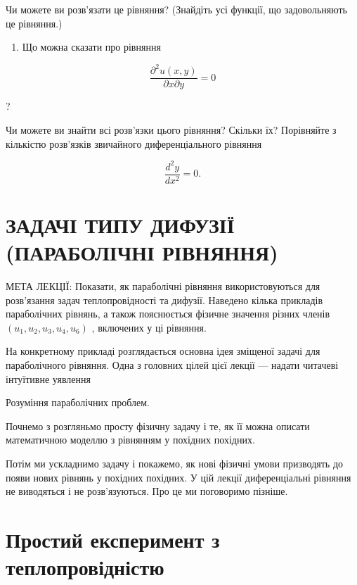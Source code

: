 \documentclass[
  ukrainian,
]{article}
\providecommand{\tightlist}{%
  \setlength{\itemsep}{0pt}\setlength{\parskip}{0pt}}
\begin{document}
Чи можете ви розв'язати це рівняння? (Знайдіть усі функції, що
задовольняють це рівняння.)

\begin{enumerate}
\def\labelenumi{\arabic{enumi}.}
\setcounter{enumi}{4}
\tightlist
\item
  Що можна сказати про рівняння
\end{enumerate}

\[
\frac{\partial^2 u(x, y)}{\partial x \partial y} = 0
\]

?

Чи можете ви знайти всі розв'язки цього рівняння? Скільки їх? Порівняйте
з кількістю розв'язків звичайного диференціального рівняння

\[
\frac{d^2y}{dx^2} = 0.
\]

\section{ЗАДАЧІ ТИПУ ДИФУЗІЇ (ПАРАБОЛІЧНІ
РІВНЯННЯ)}\label{ux437ux430ux434ux430ux447ux456-ux442ux438ux43fux443-ux434ux438ux444ux443ux437ux456ux457-ux43fux430ux440ux430ux431ux43eux43bux456ux447ux43dux456-ux440ux456ux432ux43dux44fux43dux43dux44f}

МЕТА ЛЕКЦІЇ: Показати, як параболічні рівняння використовуються для
розв'язання задач теплопровідності та дифузії. Наведено кілька прикладів
параболічних рівнянь, а також пояснюється фізичне значення різних членів
\((u_1, u_2, u_3, u_4, u_6)\) , включених у ці рівняння.

На конкретному прикладі розглядається основна ідея зміщеної задачі для
параболічного рівняння. Одна з головних цілей цієї лекції --- надати
читачеві інтуїтивне уявлення

Розуміння параболічних проблем.

Почнемо з розгляньмо просту фізичну задачу і те, як її можна описати
математичною моделлю з рівнянням у похідних похідних.

Потім ми ускладнимо задачу і покажемо, як нові фізичні умови призводять
до появи нових рівнянь у похідних похідних. У цій лекції диференціальні
рівняння не виводяться і не розв'язуються. Про це ми поговоримо пізніше.

\section{Простий експеримент з
теплопровідністю}\label{ux43fux440ux43eux441ux442ux438ux439-ux435ux43aux441ux43fux435ux440ux438ux43cux435ux43dux442-ux437-ux442ux435ux43fux43bux43eux43fux440ux43eux432ux456ux434ux43dux456ux441ux442ux44e}
\end{document}
